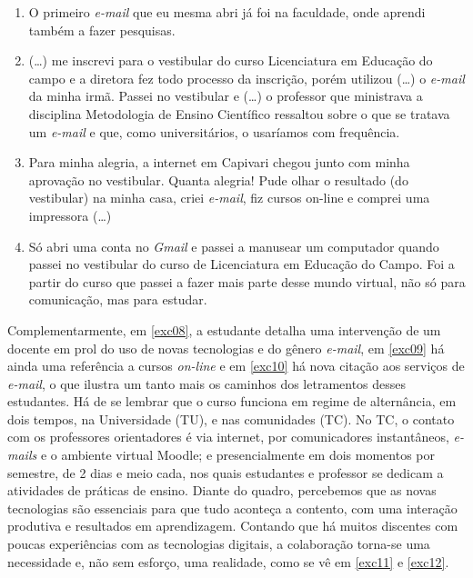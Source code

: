 \documentclass{textolivre}
\begin{document}
\begin{enumerate}[resume,label={(\arabic*)},ref={\arabic*},topsep=1ex,partopsep=1ex]
\item\label{exc07} O primeiro \textit{e-mail} que eu mesma abri já foi na faculdade, onde aprendi também a fazer pesquisas.
\item\label{exc08} (\ldots) me inscrevi para o vestibular do curso Licenciatura em Educação do campo e a diretora fez todo processo da inscrição, porém utilizou (\ldots) o \textit{e-mail} da minha irmã. Passei no vestibular e (\ldots) o professor que ministrava a disciplina Metodologia de Ensino Científico ressaltou sobre o que se tratava um \textit{e-mail} e que, como universitários, o usaríamos com frequência.
\item\label{exc09} Para minha alegria, a internet em Capivari chegou junto com minha aprovação no vestibular. Quanta alegria! Pude olhar o resultado (do vestibular) na minha casa,  criei \textit{e-mail}, fiz cursos on-line e comprei uma impressora (\ldots)
\item\label{exc10} Só abri uma conta no \textit{Gmail} e passei a manusear um computador quando passei no vestibular do curso de Licenciatura em Educação do Campo. Foi a partir do curso que passei a fazer mais parte desse mundo virtual, não só para comunicação, mas para estudar.
\end{enumerate}


Complementarmente, em \ref{exc08}, a estudante detalha uma intervenção de um docente em prol do uso de novas tecnologias e do gênero \textit{e-mail}, em \ref{exc09} há ainda uma referência a cursos \textit{on-line} e em \ref{exc10} há nova citação aos serviços de \textit{e-mail}, o que ilustra um tanto mais os caminhos dos letramentos desses estudantes. Há de se lembrar que o curso funciona em regime de alternância, em dois tempos, na Universidade (TU), e nas comunidades (TC). No TC, o contato com os professores orientadores é via internet, por comunicadores instantâneos, \textit{e-mails} e o ambiente virtual Moodle; e presencialmente em dois momentos por semestre, de 2 dias e meio cada, nos quais estudantes e professor se dedicam a atividades de práticas de ensino. Diante do quadro, percebemos que as novas tecnologias são essenciais para que tudo aconteça a contento, com uma interação produtiva e resultados em aprendizagem. Contando que há muitos discentes com poucas experiências com as tecnologias digitais, a colaboração torna-se uma necessidade e, não sem esforço, uma realidade, como se vê em \ref{exc11} e \ref{exc12}.
\end{document}

